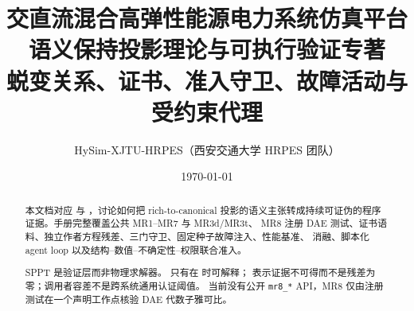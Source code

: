 \documentclass[UTF8,fontset=fandol,a4paper,11pt]{ctexart}
\title{\textbf{交直流混合高弹性能源电力系统仿真平台}\\[0.5em]
       {\Large 语义保持投影理论与可执行验证专著}\\[0.3em]
       {\large 蜕变关系、证书、准入守卫、故障活动与受约束代理}}
\author{HySim-XJTU-HRPES（西安交通大学 HRPES 团队）}
\date{\today}
\begin{document}
\maketitle
\begin{abstract}
本文档对应  与 ，讨论如何把
rich-to-canonical 投影的语义主张转成持续可证伪的程序证据。手册完整覆盖公共 MR1--MR7 与 MR3d/MR3t、
MR8 注册 DAE 测试、证书语料、独立作者方程残差、三门守卫、固定种子故障注入、性能基准、
消融、脚本化 agent loop 以及结构--数值--不确定性--权限联合准入。

SPPT 是验证层而非物理求解器。 只有在  时可解释；
 表示证据不可得而不是残差为零；调用者容差不是跨系统通用认证阈值。
当前没有公开 \texttt{mr8\_*} API，MR8 仅由注册测试在一个声明工作点核验 DAE 代数子雅可比。
\end{abstract}

\tableofcontents
\newpage












\end{document}
